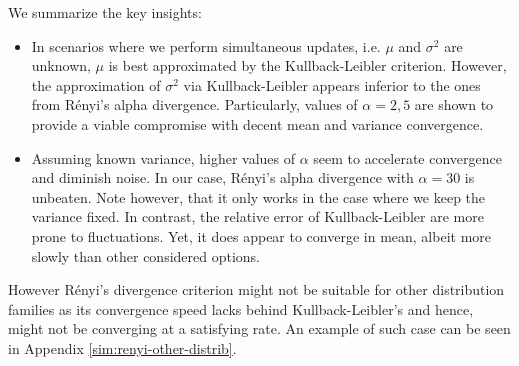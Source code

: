 \vspace{0.42cm}

We summarize the key insights:
\begin{itemize}
    \item In scenarios where we perform simultaneous updates, i.e. $\mu$ and $\sigma^2$ are unknown, $\mu$ is best approximated by the Kullback-Leibler criterion. However, the approximation of $\sigma^2$ via Kullback-Leibler appears inferior to the ones from Rényi's alpha divergence. Particularly, values of $\alpha = {2,5}$ are shown to provide a viable compromise with decent mean and variance convergence.
    \item Assuming known variance, higher values of $\alpha$ seem to accelerate convergence and diminish noise. In our case, Rényi's alpha divergence with $\alpha = 30$ is unbeaten. Note however, that it only works in the case where we keep the variance fixed. In contrast, the relative error of Kullback-Leibler are more prone to fluctuations. Yet, it does appear to converge in mean, albeit more slowly than other considered options. 
\end{itemize}


However Rényi's divergence criterion might not be suitable for other distribution families as its convergence speed lacks behind Kullback-Leibler's and hence, might not be converging at a satisfying rate. An example of such case can be seen in Appendix \ref{sim:renyi-other-distrib}.